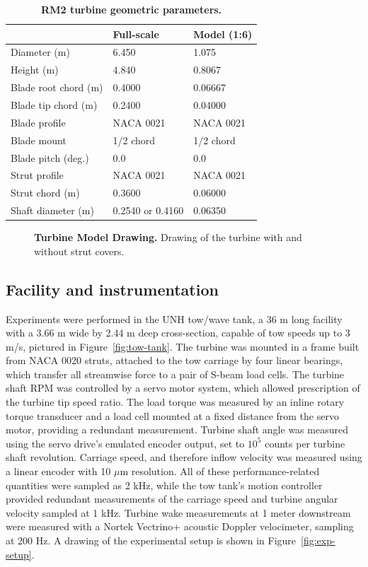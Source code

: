 \documentclass[10pt,letterpaper]{article}
\begin{document}
\begin{table}[ht]
\centering
\begin{tabular}{l|l|l}
   & Full-scale & Model (1:6) \\
\hline 
Diameter (m)   & 6.450 & 1.075 \\ 
Height (m)     & 4.840 & 0.8067 \\ 
Blade root chord (m) & 0.4000 & 0.06667 \\ 
Blade tip chord (m)  & 0.2400 & 0.04000 \\ 
Blade profile & NACA 0021 & NACA 0021 \\ 
Blade mount & 1/2 chord & 1/2 chord \\ 
Blade pitch (deg.) & 0.0 & 0.0 \\ 
Strut profile & NACA 0021 & NACA 0021 \\ 
Strut chord (m) & 0.3600 & 0.06000 \\ 
Shaft diameter (m) & 0.2540 \cite{Beam2011} or 0.4160 \cite{Hill2014} & 0.06350\\ 
\end{tabular}
\caption{\textbf{RM2 turbine geometric parameters.}}
\label{tab:turb-geom}
\end{table}

\begin{figure}[h]
\caption{{\bf Turbine Model Drawing.}
Drawing of the turbine with and without strut covers.}
\label{fig:turbine-drawing}
\end{figure}


\subsection*{Facility and instrumentation}

Experiments were performed in the UNH tow/wave tank, a 36 m long facility with a
3.66 m wide by 2.44 m deep cross-section, capable of tow speeds up to 3 m/s,
pictured in Figure~\ref{fig:tow-tank}. The turbine was mounted in a frame built
from NACA 0020 struts, attached to the tow carriage by four linear bearings,
which transfer all streamwise force to a pair of S-beam load cells. The turbine
shaft RPM was controlled by a servo motor system, which allowed prescription of
the turbine tip speed ratio. The load torque was measured by an inline rotary
torque transducer and a load cell mounted at a fixed distance from the servo
motor, providing a redundant measurement. Turbine shaft angle was measured using
the servo drive's emulated encoder output, set to $10^5$ counts per turbine
shaft revolution. Carriage speed, and therefore inflow velocity was measured
using a linear encoder with 10 $\mu$m resolution. All of these
performance-related quantities were sampled as 2 kHz, while the tow tank's
motion controller provided redundant measurements of the carriage speed and
turbine angular velocity sampled at 1 kHz. Turbine wake measurements at 1 meter
downstream were measured with a Nortek Vectrino+ acoustic Doppler velocimeter,
sampling at 200 Hz. A drawing of the experimental setup is shown in
Figure~\ref{fig:exp-setup}.
\end{document}
